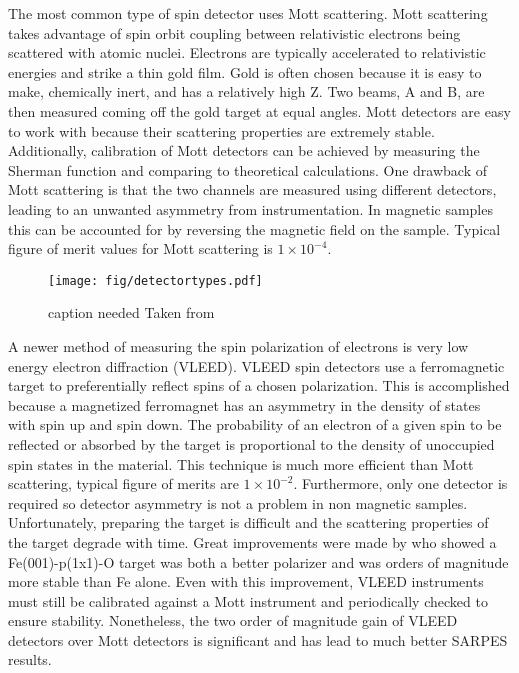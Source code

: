 \documentclass[12pt]{article}
\begin{document}
The most common type of spin detector uses Mott scattering.
Mott scattering takes advantage of spin orbit coupling between relativistic electrons being scattered with atomic nuclei.
Electrons are typically accelerated to relativistic energies and strike a thin gold film.
Gold is often chosen because it is easy to make, chemically inert, and has a relatively high Z.
Two beams, A and B, are then measured coming off the gold target at equal angles\cite{Hoesch}.
Mott detectors are easy to work with because their scattering properties are extremely stable.
Additionally, calibration of Mott detectors can be achieved by measuring the Sherman function and comparing to theoretical calculations.
One drawback of Mott scattering is that the two channels are measured using different detectors, leading to an unwanted asymmetry from instrumentation\cite{Okuda-Kimura}.
In magnetic samples this can be accounted for by reversing the magnetic field on the sample.
Typical figure of merit values for Mott scattering is $1\times10^{-4}$.

\begin{figure}[h]
  \centering
  \texttt{[image: fig/detectortypes.pdf]}
  \caption[should I put this here?]
  {caption needed Taken from \cite{Okuda-Kimura}}
  \label{fig:asymmetry}
\end{figure}

A newer method of measuring the spin polarization of electrons is very low energy electron diffraction (VLEED).
VLEED spin detectors use a ferromagnetic target to preferentially reflect spins of a chosen polarization.
This is accomplished because a magnetized ferromagnet has an asymmetry in the density of states with spin up and spin down.
The probability of an electron of a given spin to be reflected or absorbed by the target is proportional to the density of unoccupied spin states in the material\cite{Okuda-Kimura}.
This technique is much more efficient than Mott scattering, typical figure of merits are $1\times10^{-2}$.
Furthermore, only one detector is required so detector asymmetry is not a problem in non magnetic samples.
Unfortunately, preparing the target is difficult and the scattering properties of the target degrade with time.
Great improvements were made by \cite{Bertacco} who showed a Fe(001)-p(1x1)-O target was both a better polarizer and was orders of magnitude more stable than Fe alone.
Even with this improvement, VLEED instruments must still be calibrated against a Mott instrument and periodically checked to ensure stability.
Nonetheless, the two order of magnitude gain of VLEED detectors over Mott detectors is significant and has lead to much better SARPES results.
\end{document}
